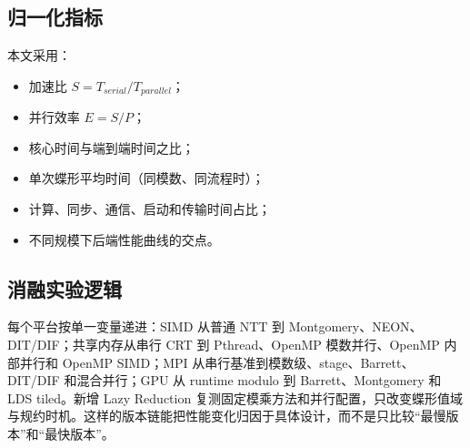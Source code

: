 \subsection{归一化指标}

本文采用：
\begin{itemize}
  \item 加速比 $S=T_{serial}/T_{parallel}$；
  \item 并行效率 $E=S/P$；
  \item 核心时间与端到端时间之比；
  \item 单次蝶形平均时间（同模数、同流程时）；
  \item 计算、同步、通信、启动和传输时间占比；
  \item 不同规模下后端性能曲线的交点。
\end{itemize}

\subsection{消融实验逻辑}

每个平台按单一变量递进：SIMD 从普通 NTT 到 Montgomery、NEON、DIT/DIF；共享内存从串行 CRT 到 Pthread、OpenMP 模数并行、OpenMP 内部并行和 OpenMP SIMD；MPI 从串行基准到模数级、stage、Barrett、DIT/DIF 和混合并行；GPU 从 runtime modulo 到 Barrett、Montgomery 和 LDS tiled。新增 Lazy Reduction 复测固定模乘方法和并行配置，只改变蝶形值域与规约时机。这样的版本链能把性能变化归因于具体设计，而不是只比较“最慢版本”和“最快版本”。
